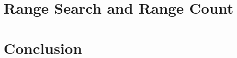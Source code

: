 \documentclass{article} %
\begin{document}


\vspace*{-0.8em}
\section{Range Search and Range Count}
\vspace*{-0.4em}




%

\section{Conclusion}






%
\end{document}
